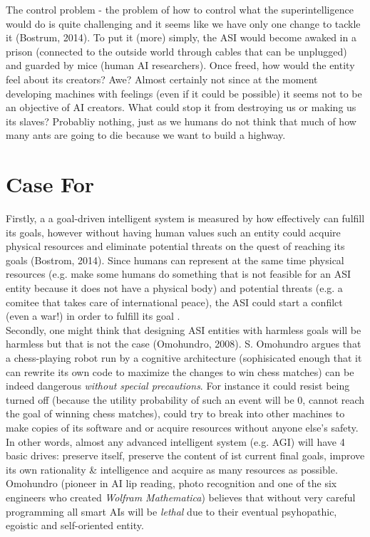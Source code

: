 \documentclass[11pt]{article}
\begin{document}
	The control problem - the problem of how to control what the superintelligence would do is quite challenging and it seems like we have only one change 
to tackle it (Bostrum, 2014). To put it (more) simply, the ASI would become awaked in a prison (connected to the outside world through cables that can be unplugged) and guarded by mice (human AI researchers). Once freed, how would the entity feel about its creators? Awe? Almost certainly not since at the moment developing machines with feelings (even if it could be possible) it seems not to be an objective of AI creators. What could stop it from destroying us or making us its slaves? Probabliy nothing, just as we humans do not think that much of how many ants are going to die because we want to build a highway. 
  
\section*{Case For}
	Firstly, a a goal-driven intelligent system is measured by how effectively can fulfill its goals, however without having human values such an entity could acquire physical resources and eliminate potential threats on the quest of reaching its goals (Bostrom, 2014). Since humans can represent at the same time physical resources (e.g. make some humans do something that is not feasible for an ASI entity because it does not have a physical body)  and potential threats (e.g. a comitee that takes care of international peace), the ASI could start a confilct (even a war!) in order to fulfill its goal .\\

	Secondly, one might think that designing ASI entities with harmless goals will be harmless but that is not the case (Omohundro, 2008).
S. Omohundro argues that a chess-playing robot run by a cognitive architecture (sophisicated enough that it can rewrite its own code to maximize the changes to win chess matches) can be indeed dangerous \textit{without special precautions}. For instance it could resist being turned off (because the utility probability of such an event will be 0, cannot reach the goal of winning chess matches), could try to break into other machines to make copies of its software and  or acquire resources without anyone else's safety. In other words, almost any advanced intelligent system (e.g. AGI) will have 4 basic drives: preserve itself, preserve the content of ist current final goals, improve its own rationality \& intelligence and acquire as many resources as possible. Omohundro (pioneer in AI lip reading, photo recognition and one of the six engineers who created \textit{Wolfram Mathematica}) believes that without very careful programming all smart AIs will be \textit{lethal} due to their eventual psyhopathic, egoistic and self-oriented entity.\\
\end{document}
